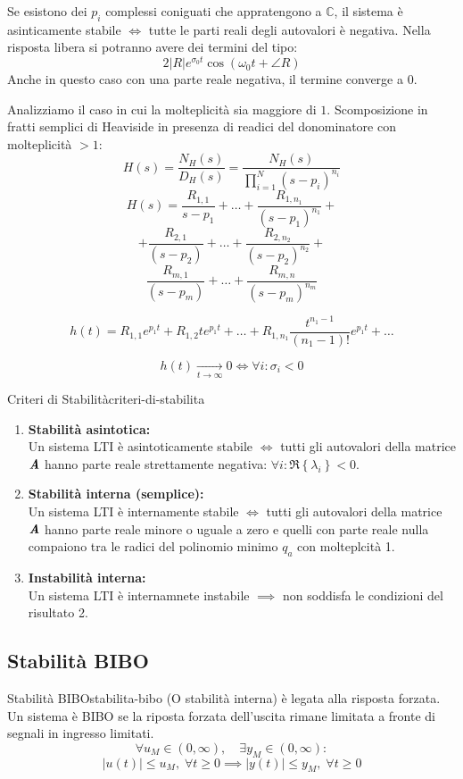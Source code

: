 \documentclass[12pt]{article}
\begin{document}
Se esistono dei $p_i$ complessi coniguati che appratengono a $\mathbb{C}$, il sistema \`e asinticamente stabile $\iff$ tutte le parti reali degli autovalori \`e negativa. Nella risposta libera si potranno avere dei termini del tipo:
\[ 2|R|e^{\sigma_0t}\cos(\omega_0t+\angle R) \]
Anche in questo caso con una parte reale negativa, il termine converge a $0$.

Analizziamo il caso in cui la molteplicit\`a sia maggiore di $1$.
Scomposizione in fratti semplici di Heaviside in presenza di readici del donominatore con molteplicit\`a $> 1$:
\[ H(s) =  \frac{N_H(s)}{D_H(s)} = \frac{N_H(s)}{\prod_{i=1}^{N} (s-p_i)^{n_i} }  \]
\[ H(s) = \frac{R _{1,1}}{s-p_1} + \dots + \frac{R _{1,n_1}}{(s-p_1)^{n_1}} + \]
\[ + \frac{R _{2,1}}{(s-p_2)} + \dots + \frac{R _{2,n_2}}{(s-p_2)^{n_2}} + \]
\[ \frac{R _{m,1}}{(s-p_m)} + \dots + \frac{R _{m,n}}{(s-p_m)^{n_m}} \]

\[ h(t) = R_{1,1}e^{p_1t} + R_{1,2}te^{p_1t} + \dots + R _{1,n_1}\frac{t^{n_1-1}}{(n_1-1)!}e^{p_1t} + \dots \]

\[ \boxed{ h(t) \underset{t \to \infty}{\longrightarrow} 0 \iff \forall i : \sigma_i < 0 } \]

\begin{definition}{Criteri di Stabilit\`a}{criteri-di-stabilita}
    \begin{enumerate}
        \item \textbf{Stabilit\`a asintotica:} \\
            Un sistema LTI \`e asintoticamente stabile $\iff$ tutti gli autovalori della matrice $\textbf{\textit{A}}$ hanno parte reale strettamente negativa: $\forall i: \Re\left\{ \lambda_i \right\} < 0$.
        \item \textbf{Stabilit\`a interna (semplice):} \\
            Un sistema LTI \`e internamente stabile $\iff$ tutti gli autovalori della matrice $\textbf{\textit{A}}$ hanno parte reale minore o uguale a zero e quelli con parte reale nulla compaiono tra le radici del polinomio minimo $q_a$ con molteplcit\`a 1.
        \item \textbf{Instabilit\`a interna:} \\
            Un sistema LTI \`e internamnete instabile $ \implies $ non soddisfa le condizioni del risultato 2.
    \end{enumerate}
\end{definition}

\newpage
\subsection{Stabilit\`a BIBO}
\begin{definition}{Stabilit\`a BIBO}{stabilita-bibo}
    (O stabilit\`a interna) \`e legata alla risposta forzata. Un sistema \`e BIBO se la riposta forzata dell'uscita rimane limitata a fronte di segnali in ingresso limitati.
    \[ \forall u_M \in (0, \infty),\quad \exists y_M \in (0, \infty): \]
    \[ |u(t)| \leqslant u_M,\;\forall t \geqslant 0 \implies |y(t)| \leqslant y_M,\;\forall t \geqslant 0 \]
\end{definition}
\end{document}
